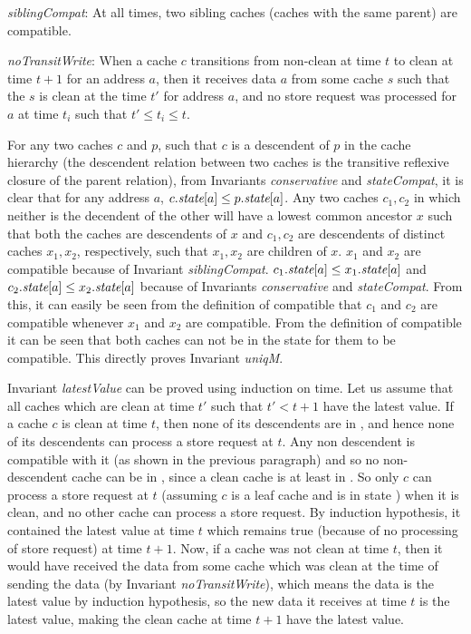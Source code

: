 \begin{inv}
\textit{siblingCompat}: At all times, two sibling caches (\ie caches with the
same parent) are compatible.
\label{siblingCompat}
\end{inv}

\begin{inv}
\textit{noTransitWrite}: When a cache $c$ transitions from non-clean at time
$t$ to clean at time $t+1$ for an address $a$, then it receives data $a$ from
some cache $s$ such that the $s$ is clean at the time $t'$ for address $a$, and
no store request was processed for $a$ at time $t_i$ such that $t' \le t_i \le
t$.
\label{noTransitWrite}
\end{inv}

For any two caches $c$ and $p$, such that $c$ is a descendent of $p$ in the cache
hierarchy (the descendent relation between two caches is the transitive
reflexive closure of the parent relation), from Invariants
\textit{conservative} and \textit{stateCompat}, it is clear that for any
address $a$, $c.\textit{state}[a] \le p.\textit{state}[a]$. Any two caches $c_1, c_2$ in which
neither is the decendent of the other will have a lowest common ancestor $x$
such that both the caches are descendents of $x$ and $c_1, c_2$ are descendents
of distinct caches $x_1, x_2$, respectively, such that $x_1, x_2$ are children
of $x$. $x_1$ and $x_2$ are compatible because of Invariant
\textit{siblingCompat}. $c_1.\textit{state}[a] \le x_1.\textit{state}[a]$ and
$c_2.\textit{state}[a] \le x_2.\textit{state}[a]$ because of Invariants \textit{conservative}
and \textit{stateCompat}. From this, it can easily be seen from the definition
of compatible that $c_1$ and $c_2$ are compatible whenever $x_1$ and $x_2$ are
compatible. From the definition of compatible it can be seen that both caches can not
be in the \Mo{} state for them to be compatible. This directly proves Invariant
\textit{uniqM}.

Invariant \textit{latestValue} can be proved using induction on time. Let us
assume that all caches which are clean at time $t'$ such that $t'<t+1$ have the
latest value. If a cache $c$ is clean at time $t$, then none of its descendents
are in \Mo, and hence none of its descendents can process a store request at
$t$. Any non descendent is compatible with it (as shown in the previous
paragraph) and so no non-descendent cache can be in \Mo, since a clean cache is
at least in \Sh. So only $c$ can process a store request at $t$ (assuming $c$
is a leaf cache and is in state \Mo) when it is clean, and no other cache can
process a store request. By induction hypothesis, it contained the latest value
at time $t$ which remains true (because of no processing of store request) at
time $t+1$. Now, if a cache was not clean at time $t$, then it would have
received the data from some cache which was clean at the time of sending the
data (by Invariant \textit{noTransitWrite}), which means the data is the latest
value by induction hypothesis, so the new data it receives at time $t$ is the
latest value, making the clean cache at time $t+1$ have the latest value.

